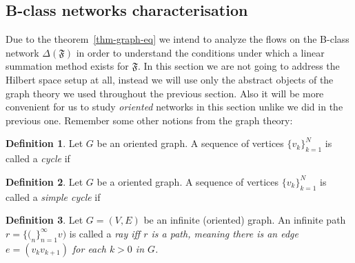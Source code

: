 \documentclass[12pt]{article}
\theoremstyle{definition}
\newtheorem{definition}{Definition}
\newcommand{\seq}[1]{\{{#1}_n\}_{n=1}^\infty}
\newcommand{\fsys}{\mathfrak{F}}
\newcommand{\net}{\Delta}
\numberwithin{remark}{section}
\numberwithin{theorem}{section}
\numberwithin{prop}{section}
\numberwithin{equation}{section}
\numberwithin{lemma}{section}
\numberwithin{prop_under_lemma}{lemma}
\begin{document}
  \subsection{B-class networks characterisation}
    Due to the theorem~\ref{thm-graph-eq} we intend to analyze the flows on the B-class network
      $\net(\fsys)$ in order to understand the conditions under which a linear
      summation method exists for $\fsys$.
    In this section we are not going to address the Hilbert space setup at all,
      instead we will use only the abstract objects of the graph theory
      we used throughout the previous section.
    Also it will be more convenient for us to study \emph{oriented} networks in this section unlike we
      did in the previous one.
    Remember some other notions from the graph theory:
    \begin{definition}
      Let $G$ be an oriented graph.
      A sequence of vertices $\{v_k\}_{k=1}^N$ is called a \emph{cycle} if 
    \end{definition}
    \begin{definition}
      Let $G$ be a oriented graph.
      A sequence of vertices $\{v_k\}_{k=1}^N$ is called a \emph{simple cycle} if 
    \end{definition}
    \begin{definition}
      Let $G = (V, E)$ be an infinite (oriented) graph.
      An infinite path $r = \seq(v)$ is called a \it{ray} iff
      $r$ is a path, meaning there is an edge $e = (v_k v_{k+1})$ for each $k > 0$ in $G$.
    \end{definition}
\end{document}
